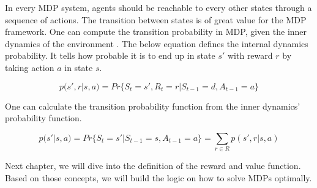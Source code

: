In every MDP system, agents should be reachable to every other states through a sequence of actions. The transition between states is of great value for the MDP framework.
One can compute the transition probability in MDP, given the inner dynamics of the environment \cite{Sutton2018}. The below equation defines the internal dynamics probability. It tells how probable it is to end up in state \(s'\) with reward \(r\) by taking action \(a\) in state \(s\). 

\begin{equation}
    p(s',r | s,a) = Pr\{S_t = s', R_t = r | S_{t-1} = d, A_{t-1} = a\}
\end{equation}

One can calculate the transition probability function from the inner dynamics' probability function.

\begin{equation}
    p(s'|s,a) = Pr\{S_t=s'| S_{t-1}=s, A_{t-1}=a\} = \sum_{r \in R}p(s',r|s,a)
\end{equation}

Next chapter, we will dive into the definition of the reward and value function. Based on those concepts, we will build the logic on how to solve MDPs optimally.